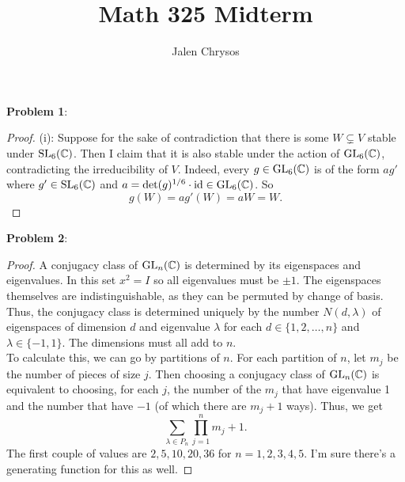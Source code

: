 \documentclass{amsart}
\title{Math 325 Midterm}
\author{Jalen Chrysos}
\begin{document}
	\maketitle
	
	\textbf{Problem 1}:
	
	\begin{proof}
		(i): Suppose for the sake of contradiction that there is some $W\subsetneq V$ stable under $\operatorname{SL}_6(\mathbb{C})$. Then I claim that it is also stable under the action of $\operatorname{GL}_6(\mathbb{C})$, contradicting the irreducibility of $V$. Indeed, every $g\in \operatorname{GL}_6(\mathbb{C})$ is of the form $a g'$ where $g'\in \operatorname{SL}_6(\mathbb{C})$ and $a=\det(g)^{1/6}\cdot \operatorname{id} \in \operatorname{GL}_6(\mathbb{C})$. So 
		$$
		g(W) = ag'(W) = aW = W.
		$$
	\end{proof}
	
	\newpage 
	
	\textbf{Problem 2}:
	
	\begin{proof}
		A conjugacy class of $\operatorname{GL}_n(\mathbb{C})$ is determined by its eigenspaces and eigenvalues. In this set $x^2=I$ so all eigenvalues must be $\pm 1$. The eigenspaces themselves are indistinguishable, as they can be permuted by change of basis. Thus, the conjugacy class is determined uniquely by the number $N(d,\lambda)$ of eigenspaces of dimension $d$ and eigenvalue $\lambda$ for each $d\in \{1,2,\dots,n\}$ and $\lambda \in \{-1,1\}$. The dimensions must all add to $n$.\\
		
		To calculate this, we can go by partitions of $n$. For each partition of $n$, let $m_j$ be the number of pieces of size $j$. Then choosing a conjugacy class of $\operatorname{GL}_n(\mathbb{C})$ is equivalent to choosing, for each $j$, the number of the $m_j$ that have eigenvalue 1 and the number that have $-1$ (of which there are $m_j+1$ ways). Thus, we get
		$$
		\sum_{\lambda \in P_n} \prod_{j=1}^n m_j+1.
		$$
		The first couple of values are $2,5,10,20,36$ for $n=1,2,3,4,5$. I'm sure there's a generating function for this as well.
	\end{proof}
	\newpage 
	
\end{document}
